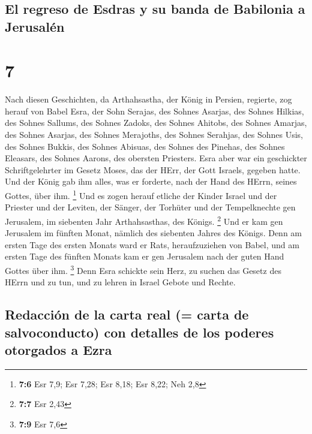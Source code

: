 \hypertarget{el-regreso-de-esdras-y-su-banda-de-babilonia-a-jerusaluxe9n}{%
\subsection{El regreso de Esdras y su banda de Babilonia a
Jerusalén}\label{el-regreso-de-esdras-y-su-banda-de-babilonia-a-jerusaluxe9n}}

\hypertarget{section-6}{%
\section{7}\label{section-6}}

 Nach diesen Geschichten, da Arthahsastha, der König in
Persien, regierte, zog herauf von Babel Esra, der Sohn Serajas, des
Sohnes Asarjas, des Sohnes Hilkias,  des Sohnes Sallums,
des Sohnes Zadoks, des Sohnes Ahitobs,  des Sohnes
Amarjas, des Sohnes Asarjas, des Sohnes Merajoths,  des
Sohnes Serahjas, des Sohnes Usis, des Sohnes Bukkis,  des
Sohnes Abisuas, des Sohnes des Pinehas, des Sohnes Eleasars, des Sohnes
Aarons, des obersten Priesters.  Esra aber war ein
geschickter Schriftgelehrter im Gesetz Moses, das der HErr, der Gott
Israels, gegeben hatte. Und der König gab ihm alles, was er forderte,
nach der Hand des HErrn, seines Gottes, über ihm. \footnote{\textbf{7:6}
  Esr 7,9; Esr 7,28; Esr 8,18; Esr 8,22; Neh 2,8}  Und es
zogen herauf etliche der Kinder Israel und der Priester und der Leviten,
der Sänger, der Torhüter und der Tempelknechte gen Jerusalem, im
siebenten Jahr Arthahsasthas, des Königs. \footnote{\textbf{7:7} Esr
  2,43}  Und er kam gen Jerusalem im fünften Monat,
nämlich des siebenten Jahres des Königs.  Denn am ersten
Tage des ersten Monats ward er Rats, heraufzuziehen von Babel, und am
ersten Tage des fünften Monats kam er gen Jerusalem nach der guten Hand
Gottes über ihm. \footnote{\textbf{7:9} Esr 7,6}  Denn
Esra schickte sein Herz, zu suchen das Gesetz des HErrn und zu tun, und
zu lehren in Israel Gebote und Rechte.

\hypertarget{redacciuxf3n-de-la-carta-real-carta-de-salvoconducto-con-detalles-de-los-poderes-otorgados-a-ezra}{%
\subsection{Redacción de la carta real (= carta de salvoconducto) con
detalles de los poderes otorgados a
Ezra}\label{redacciuxf3n-de-la-carta-real-carta-de-salvoconducto-con-detalles-de-los-poderes-otorgados-a-ezra}}

